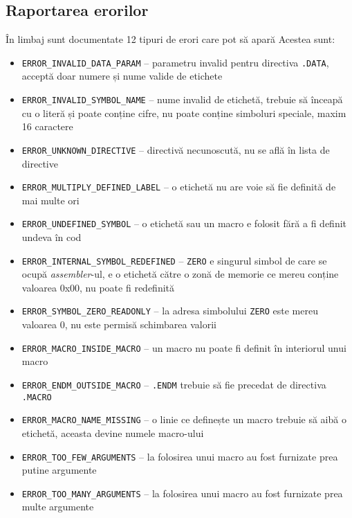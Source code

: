 \documentclass[../main.tex]{subfiles}
\begin{document}
\subsection{Raportarea erorilor}
În limbaj sunt documentate 12 tipuri de erori care pot să apară Acestea sunt:
\begin{itemize}
    \item \verb|ERROR_INVALID_DATA_PARAM| -- parametru invalid pentru directiva \verb|.DATA|, acceptă doar numere și nume valide de etichete
    \item \verb|ERROR_INVALID_SYMBOL_NAME| -- nume invalid de etichetă, trebuie să înceapă cu o literă și poate conține cifre, nu poate conține simboluri speciale, maxim 16 caractere
    \item \verb|ERROR_UNKNOWN_DIRECTIVE| -- directivă necunoscută, nu se află în lista de directive
    \item \verb|ERROR_MULTIPLY_DEFINED_LABEL| -- o etichetă nu are voie să fie definită de mai multe ori
    \item \verb|ERROR_UNDEFINED_SYMBOL| -- o etichetă sau un macro e folosit fără a fi definit undeva în cod
    \item \verb|ERROR_INTERNAL_SYMBOL_REDEFINED| -- \verb|ZERO| e singurul simbol de care se ocupă \emph{assembler}-ul, e o etichetă către o zonă de memorie ce mereu conține valoarea 0x00, nu poate fi redefinită
    \item \verb|ERROR_SYMBOL_ZERO_READONLY| -- la adresa simbolului \verb|ZERO| este mereu valoarea 0, nu este permisă schimbarea valorii
    \item \verb|ERROR_MACRO_INSIDE_MACRO| -- un macro nu poate fi definit în interiorul unui macro
    \item \verb|ERROR_ENDM_OUTSIDE_MACRO| -- \verb|.ENDM| trebuie să fie precedat de directiva \verb|.MACRO|
    \item \verb|ERROR_MACRO_NAME_MISSING| -- o linie ce definește un macro trebuie să aibă o etichetă, aceasta devine numele macro-ului
    \item \verb|ERROR_TOO_FEW_ARGUMENTS| -- la folosirea unui macro au fost furnizate prea putine argumente
    \item \verb|ERROR_TOO_MANY_ARGUMENTS| -- la folosirea unui macro au fost furnizate prea multe argumente
\end{itemize}
    
\end{document}
